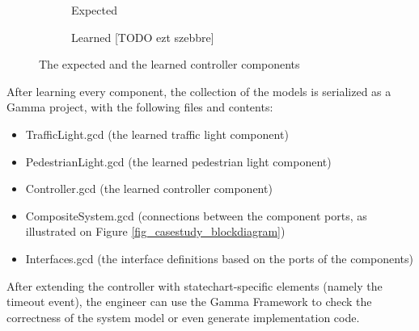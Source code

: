 \begin{figure}[!ht] 
	\centering
	\begin{subfigure}[b]{0.9\textwidth}
		\centering
		\caption{Expected}
	\end{subfigure}
	\hfill
	\begin{subfigure}[b]{0.9\textwidth}
		\centering
		\caption{Learned [TODO ezt szebbre]}	
	\end{subfigure}
	\caption{The expected and the learned controller components}
	\label{fig_casestudy_controllerdiff}
\end{figure}

After learning every component, the collection of the models is serialized as a Gamma project, with the following files and contents:
\begin{itemize}
	\item TrafficLight.gcd (the learned traffic light component)
	\item PedestrianLight.gcd (the learned pedestrian light component)
	\item Controller.gcd (the learned controller component)
	\item CompositeSystem.gcd (connections between the component ports, as illustrated on Figure \ref{fig_casestudy_blockdiagram})
	\item Interfaces.gcd (the interface definitions based on the ports of the components)
\end{itemize}
After extending the controller with statechart-specific elements (namely the timeout event), the engineer can use the Gamma Framework to check the correctness of the system model or even generate implementation code.


